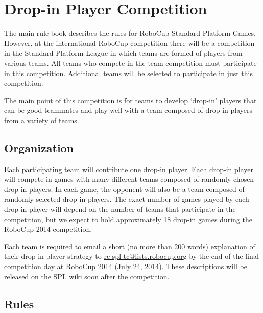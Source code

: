 \documentclass[12pt]{article}
\begin{document}
\newpage


\appendix
\section{Drop-in Player Competition}
\label{sec:drop-in}
The main rule book describes the rules for RoboCup Standard Platform Games.  However, at the international RoboCup competition there will be a competition in the Standard Platform League in which teams are formed of players from various teams.  All teams who compete in the team competition must participate in this competition.  Additional teams will be selected to participate in just this competition.

The main point of this competition is for teams to develop `drop-in' players that can be good teammates and play well with a team composed of drop-in players from a variety of teams.

\subsection{Organization}

Each participating team will contribute one drop-in player.  Each drop-in player will compete in games with many different teams composed of randomly chosen drop-in players.  In each game, the opponent will also be a team composed of randomly selected drop-in players.  The exact number of games played by each drop-in player will depend on the number of teams that participate in the competition, but we expect to hold approximately 18 drop-in games during the RoboCup 2014 competition.

Each team is required to email a short (no more than 200 words) explanation of their drop-in player strategy to \url{rc-spl-tc@lists.robocup.org} by the end of the final competition day at RoboCup 2014 (July 24, 2014).  These descriptions will be released on the SPL wiki soon after the competition.

\subsection{Rules}
\end{document}
